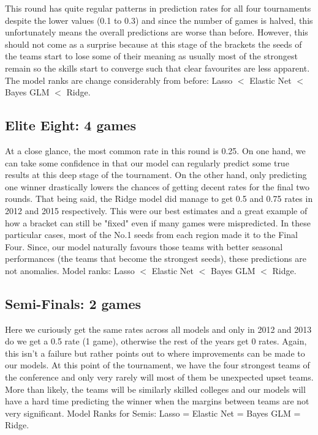 \documentclass{article} %
\begin{document}
This round has quite regular patterns in prediction rates for all four tournaments despite the lower values (0.1 to 0.3) and since the number of games is halved, this unfortunately means the overall predictions are worse than before. However, this should not come as a surprise because at this stage of the brackets the seeds of the teams start to lose some of their meaning as usually most of the strongest remain so the skills start to converge such that clear favourites are less apparent. The model ranks are change considerably from before: Lasso  $<$ Elastic Net $<$ Bayes GLM $<$ Ridge.   

\subsection{Elite Eight: 4 games}

At a close glance, the most common rate in this round is 0.25. On one hand, we can take some confidence in that our model can regularly predict some true results at this deep stage of the tournament. On the other hand, only predicting one winner drastically lowers the chances of getting decent rates for the final two rounds. That being said, the Ridge model did manage to get 0.5 and 0.75 rates in 2012 and 2015 respectively. This were our best estimates and a great example of how a bracket can still be "fixed" even if many games were mispredicted. In these particular cases, most of the No.1 seeds from each region made it to the Final Four. Since, our model naturally favours those teams with better seasonal performances (the teams that become the strongest seeds), these predictions are not anomalies. Model ranks: Lasso  $<$ Elastic Net $<$ Bayes GLM $<$ Ridge.  

\subsection{Semi-Finals: 2 games}

Here we curiously get the same rates across all models and only in 2012 and 2013 do we get a 0.5 rate (1 game), otherwise the rest of the years get 0 rates. Again, this isn't a failure but rather points out to where improvements can be made to our models. At this point of the tournament, we have the four strongest teams of the conference and only very rarely will most of them be unexpected upset teams. More than likely, the teams will be similarly skilled colleges and our models will have a hard time predicting the winner when the margins between teams are not very significant. Model Ranks for Semis: Lasso  = Elastic Net = Bayes GLM = Ridge.  
\end{document}
